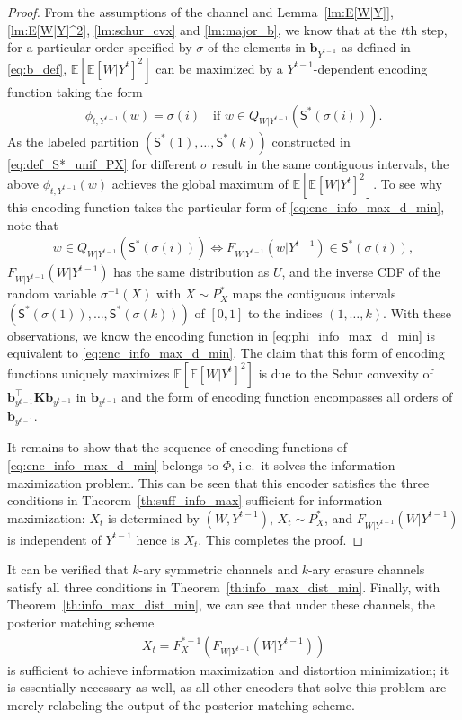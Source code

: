 \documentclass{article}
\newcommand{\E}{\mathbb{E}}
\def\sS{{\mathsf S}}
\begin{document}
\begin{proof}
From the assumptions of the channel and  Lemma~\ref{lm:E[W|Y]}, \ref{lm:E[W|Y]^2}, \ref{lm:schur_cvx} and \ref{lm:major_b}, we know that at the $t$th step, for a particular order specified by $\sigma$ of the elements in $\boldsymbol{b}_{Y^{t-1}}$ as defined in \eqref{eq:b_def}, $\E[\E[W|Y^{t}]^2]$ can be maximized by a $Y^{t-1}$-dependent encoding function taking the form
\begin{align}
    \phi_{t,Y^{t-1}}(w) = \sigma(i) \quad\text{if } w\in Q_{W|Y^{t-1}}(\sS^*(\sigma(i))) . \label{eq:phi_info_max_d_min}
\end{align}
As %
the labeled partition $(\sS^*(1),\ldots,\sS^*(k))$ constructed in \eqref{eq:def_S*_unif_PX} for different $\sigma$ result in the same contiguous intervals, the above $\phi_{t,Y^{t-1}}(w)$ achieves the global maximum of $\E[\E[W|Y^{t}]^2]$.
To see why this encoding function takes the particular form of \eqref{eq:enc_info_max_d_min}, note that
\begin{align}
w\in Q_{W|Y^{t-1}}(\sS^*(\sigma(i)))
\Leftrightarrow F_{W|Y^{t-1}}(w|Y^{t-1}) \in 
\sS^*(\sigma(i)) , \nonumber
\end{align}
$F_{W|Y^{t-1}}(W|Y^{t-1})$ has the same distribution as $U$, and the inverse CDF of the random variable $\sigma^{-1}(X)$ with $X\sim P_X^*$ maps the contiguous intervals
$(\sS^*({\sigma(1)}), \ldots, \sS^*(\sigma(k)))$ of $[0,1]$ to the indices $(1,\ldots,k)$.
With these observations, we know the encoding function in \eqref{eq:phi_info_max_d_min} is equivalent to \eqref{eq:enc_info_max_d_min}.
The claim that this form of encoding functions uniquely maximizes $\E[\E[W|Y^{t}]^2]$ is due to the Schur convexity of $ {\boldsymbol b}_{y^{t-1}}^\top {\boldsymbol K} {\boldsymbol b}_{y^{t-1}} $ in ${\boldsymbol b}_{y^{t-1}}$ and the form of encoding function encompasses all orders of ${\boldsymbol b}_{y^{t-1}}$.

It remains to show that the sequence of encoding functions of \eqref{eq:enc_info_max_d_min} belongs to $\mathsf\Phi$, i.e.\ it solves the information maximization problem. 
This can be seen that this encoder satisfies the three conditions in Theorem~\ref{th:suff_info_max} sufficient for information maximization: $X_t$ is determined by $(W,Y^{t-1})$, $X_t\sim P_X^*$, and $F_{W|Y^{t-1}}(W|Y^{t-1})$ is independent of $Y^{t-1}$ hence is $X_t$.
This completes the proof.
\end{proof}

It can be verified that $k$-ary symmetric channels and $k$-ary erasure channels satisfy all three conditions in Theorem~\ref{th:info_max_dist_min}.
Finally, with Theorem~\ref{th:info_max_dist_min}, we can see that under these channels, the posterior matching scheme
\begin{align}
    X_t = F_X^{*-1}(F_{W|Y^{t-1}}(W|Y^{t-1})) \label{eq:posterior_matching}
\end{align}
is sufficient to achieve information maximization and distortion minimization; it is essentially necessary as well, as all other encoders that solve this problem are merely relabeling the output of the posterior matching scheme.

{
    \small
    
}
\end{document}
